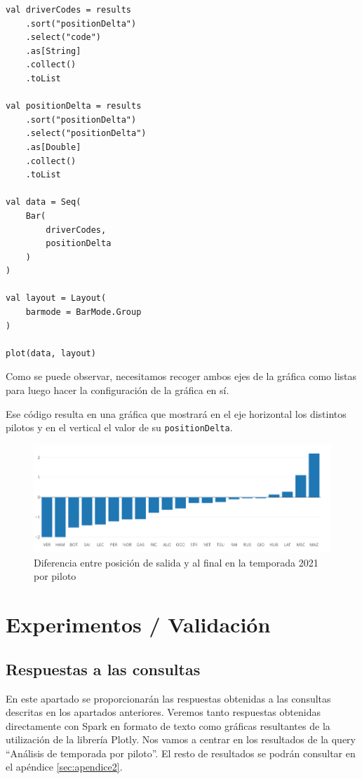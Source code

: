 \documentclass[12pt,twoside,titlepage]{report}
\newcommand{\quotes}[1]{``#1''}
\begin{document}
\begin{lstlisting}
val driverCodes = results
	.sort("positionDelta")
	.select("code")
	.as[String]
	.collect()
	.toList
	
val positionDelta = results
	.sort("positionDelta")
	.select("positionDelta")
	.as[Double]
	.collect()
	.toList
	
val data = Seq(
	Bar(
		driverCodes,  
		positionDelta
	)
)
	
val layout = Layout( 
	barmode = BarMode.Group
)
	
plot(data, layout)
\end{lstlisting}

Como se puede observar, necesitamos recoger ambos ejes de la gráfica como listas para luego hacer la configuración de la gráfica en sí.

Ese código resulta en una gráfica que mostrará en el eje horizontal los distintos pilotos y en el vertical el valor de su \texttt{positionDelta}.

\begin{figure}[H]
	\includegraphics[scale=0.4]{results/seasonanalysis/positionDelta.png}
	\centering
	\caption{Diferencia entre posición de salida y al final en la temporada 2021 por piloto}
	\label{fig:positionDelta}
	\centering
\end{figure}


\chapter{Experimentos / Validación}
\label{sec:expVal}
\newpage


\section{Respuestas a las consultas}

En este apartado se proporcionarán las respuestas obtenidas a las consultas descritas en los apartados anteriores. Veremos tanto respuestas obtenidas directamente con Spark en formato de texto como gráficas resultantes de la utilización de la librería Plotly. Nos vamos a centrar en los resultados de la query \quotes{Análisis de temporada por piloto}. El resto de resultados se podrán consultar en el apéndice \ref{sec:apendice2}.
\end{document}
